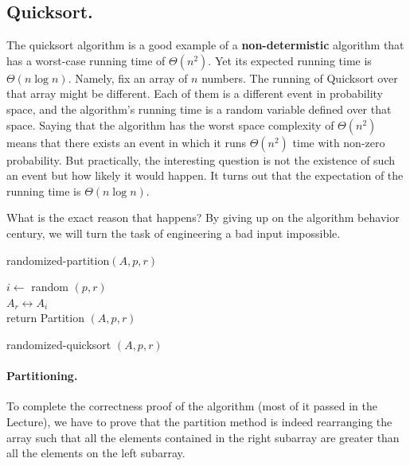 
\subsection*{Quicksort.}
The quicksort algorithm is a good example of a \textbf{non-determistic} algorithm that has a worst-case running time of $\Theta\left(n^{2}\right)$. Yet its expected running time is $\Theta\left(n\log n\right)$. Namely, fix an array of $n$ numbers. The running of Quicksort over that array might be different. Each of them is a different event in probability space, and the algorithm's running time is a random variable defined over that space. Saying that the algorithm has the worst space complexity of $\Theta(n^{2})$ means that there exists an event in which it runs $\Theta\left(n^{2}\right)$ time with non-zero probability. But practically, the interesting question is not the existence of such an event but how likely it would happen. It turns out that the expectation of the running time is $\Theta\left(n\log n\right)$.  

What is the exact reason that happens? By giving up on the algorithm behavior century, we will turn the task of engineering a bad input impossible.    
 
\begin{algbox}{randomized-partition$(A, p, r)$}
  \begin{algorithm}[H]
      $i \leftarrow $ random $(p, r)$ \\
      $A_{r} \leftrightarrow A_{i} $ \\
      return Partition $(A, p, r)$
    \end{algorithm}
\end{algbox}
 \begin{algbox}{randomized-quicksort $(A, p, r)$}
      \begin{algorithm}[H]
      \end{algorithm}
\end{algbox}


\paragraph{Partitioning.}
To complete the correctness proof of the algorithm (most of it passed in the Lecture), we have to prove that the partition method is indeed rearranging the array such that all the elements contained in the right subarray are greater than all the elements on the left subarray.  

